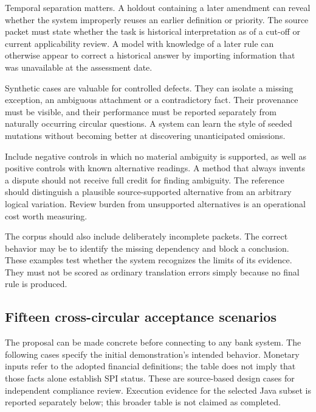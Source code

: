 \documentclass[12pt,a4paper,oneside,openany]{book}
\begin{document}
Temporal separation matters. A holdout containing a later amendment can reveal
whether the system improperly reuses an earlier definition or priority. The
source packet must state whether the task is historical interpretation as of a
cut-off or current applicability review. A model with knowledge of a later rule
can otherwise appear to correct a historical answer by importing information
that was unavailable at the assessment date.

Synthetic cases are valuable for controlled defects. They can isolate a missing
exception, an ambiguous attachment or a contradictory fact. Their provenance must
be visible, and their performance must be reported separately from naturally
occurring circular questions. A system can learn the style of seeded mutations
without becoming better at discovering unanticipated omissions.

Include negative controls in which no material ambiguity is supported, as well
as positive controls with known alternative readings. A method that always
invents a dispute should not receive full credit for finding ambiguity. The
reference should distinguish a plausible source-supported alternative from an
arbitrary logical variation. Review burden from unsupported alternatives is an
operational cost worth measuring.

The corpus should also include deliberately incomplete packets. The correct
behavior may be to identify the missing dependency and block a conclusion. These
examples test whether the system recognizes the limits of its evidence. They
must not be scored as ordinary translation errors simply because no final rule
is produced.

\subsection{Fifteen cross-circular acceptance scenarios}
\label{merge:P-05-evidence:00}

\label{sec:evidence}

The proposal can be made concrete before connecting to any bank system. The
following cases specify the initial demonstration's intended behavior. Monetary
inputs refer to the adopted financial definitions; the table does not imply that
those facts alone establish SPI status. These are source-based design cases for
independent compliance review. Execution evidence for the selected Java subset
is reported separately below; this broader table is not claimed as completed.
\end{document}
